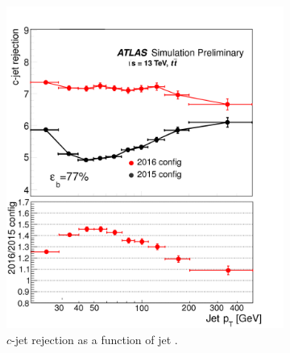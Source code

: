\begin{figure}[htbp!]
\centering
\captionsetup{justification=centering}
    \begin{subfigure}[b]{0.4\textwidth}
        \includegraphics[width=\textwidth]{figures/object/c_rej_pt}
        \caption{$c$-jet rejection as a function of jet \pt.}
        \label{fig:obj_c_rej}
    \end{subfigure}
    \quad
    \begin{subfigure}[b]{0.4\textwidth}

\end{subfigure}
\end{figure}
